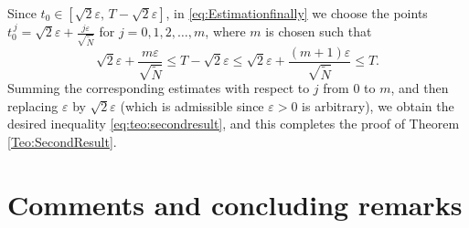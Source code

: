 \documentclass[11pt,oneside,leqno]{amsart}
\numberwithin{equation}{section}
\numberwithin{equation}{section}
\begin{document}
Since $t_0 \in [\sqrt{2}\varepsilon,\, T-\sqrt{2}\varepsilon]$, in \eqref{eq:Estimationfinally} we choose the points $t_0^{\,j} = \sqrt{2}\varepsilon + \frac{j\varepsilon}{\sqrt{\tilde{N}}}$ for $j = 0,1,2,\ldots,m$, where $m$ is chosen such that
\[
\sqrt{2}\varepsilon + \frac{m\varepsilon}{\sqrt{\tilde{N}}}
\le T-\sqrt{2}\varepsilon
\le \sqrt{2}\varepsilon + \frac{(m+1)\varepsilon}{\sqrt{\tilde{N}}}
\le T.
\]
Summing the corresponding estimates with respect to $j$ from $0$ to $m$, and then replacing $\varepsilon$ by $\sqrt{2}\varepsilon$ (which is admissible since $\varepsilon>0$ is arbitrary), we obtain the desired inequality \eqref{eq:teo:secondresult}, and this completes the proof of Theorem \ref{Teo:SecondResult}.
\section{Comments and concluding remarks}
\end{document}
